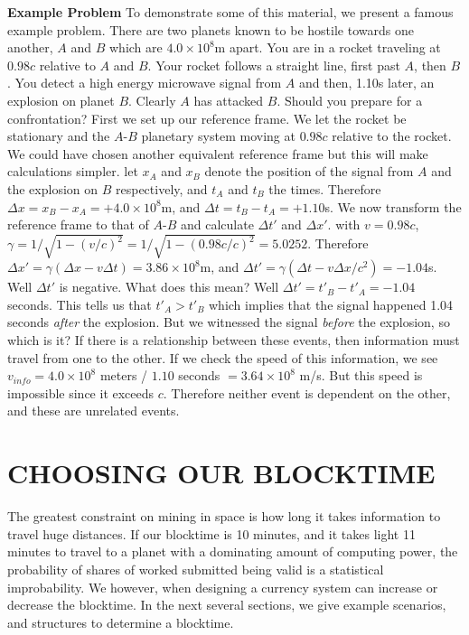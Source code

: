 \documentclass[conference]{IEEEtran}
\begin{document}
\textbf{Example Problem} To demonstrate some of this material, we present a famous example problem. There are two planets known to be hostile towards one another, $A$ and $B$ which are $4.0 \times 10^8 $m apart. You are in a rocket traveling at $0.98c$ relative to $A$ and $B$. Your rocket follows a straight line, first past $A$, then $B$. You detect a high energy microwave signal from $A$ and then, 1.10s later, an explosion on planet $B$. Clearly $A$ has attacked $B$. Should you prepare for a confrontation? First we set up our reference frame. We let the rocket be stationary and the $A$-$B$ planetary system moving at $0.98c$ relative to the rocket. We could have chosen another equivalent reference frame but this will make calculations simpler. let $x_A$ and $x_B$ denote the position of the signal from $A$ and the explosion on $B$ respectively, and $t_A$ and $t_B$ the times. Therefore $\Delta x = x_B - x_A = +4.0 \times 10^8$m, and $\Delta t = t_B - t_A = +1.10$s. We now transform the reference frame to that of $A$-$B$ and calculate $\Delta t'$ and $\Delta x'$. with $v = 0.98c$, $\gamma = 1/\sqrt{1-(v/c)^2} = 1/\sqrt{1-(0.98c/c)^2} = 5.0252$. Therefore $\Delta x' = \gamma(\Delta x - v\Delta t) = 3.86 \times 10^8$m, and $\Delta t' = \gamma (\Delta t - v\Delta x/c^2) = -1.04$s. Well $\Delta t'$ is negative. What does this mean? Well $\Delta t' = t'_B - t'_A = -1.04$ seconds. This tells us that $t'_A > t'_B$ which implies that the signal happened 1.04 seconds \textit{after} the explosion. But we witnessed the signal \textit{before} the explosion, so which is it? If there is a relationship between these events, then information must travel from one to the other. If we check the speed of this information, we see $v_{info} = 4.0 \times 10^8$ meters / $1.10$ seconds $ = 3.64 \times 10^8$ m/s. But this speed is impossible since it exceeds $c$. Therefore neither event is dependent on the other, and these are unrelated events.
 
\section{CHOOSING OUR BLOCKTIME}
The greatest constraint on mining in space is how long it takes information to travel huge distances. If our blocktime is 10 minutes, and it takes light 11 minutes to travel to a planet with a dominating amount of computing power, the probability of shares of worked submitted being valid is a statistical improbability. We however, when designing a currency system can increase or decrease the blocktime. In the next several sections, we give example scenarios, and structures to determine a blocktime. 
\end{document}
